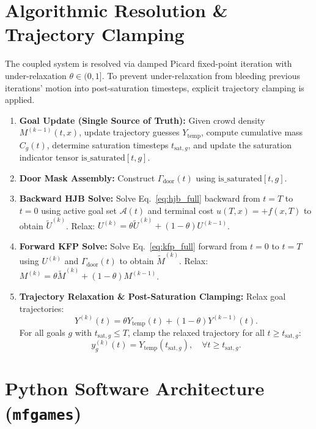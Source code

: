 \documentclass[11pt,a4paper]{article}
\begin{document}
\section{Algorithmic Resolution \& Trajectory Clamping}

The coupled system is resolved via damped Picard fixed-point iteration with under-relaxation $\theta \in (0, 1]$. To prevent under-relaxation from bleeding previous iterations' motion into post-saturation timesteps, explicit trajectory clamping is applied.

\begin{enumerate}
    \item \textbf{Goal Update (Single Source of Truth):} Given crowd density $M^{(k-1)}(t, x)$, update trajectory guesses $Y_{\text{temp}}$, compute cumulative mass $C_g(t)$, determine saturation timesteps $t_{\text{sat}, g}$, and update the saturation indicator tensor $\text{is\_saturated}[t, g]$.
    \item \textbf{Door Mask Assembly:} Construct $\Gamma_{\text{door}}(t)$ using $\text{is\_saturated}[t, g]$.
    \item \textbf{Backward HJB Solve:} Solve Eq.~\eqref{eq:hjb_full} backward from $t = T$ to $t = 0$ using active goal set $\mathcal{A}(t)$ and terminal cost $u(T, x) = +f(x, T)$ to obtain $\tilde{U}^{(k)}$. Relax: $U^{(k)} = \theta \tilde{U}^{(k)} + (1-\theta) U^{(k-1)}$.
    \item \textbf{Forward KFP Solve:} Solve Eq.~\eqref{eq:kfp_full} forward from $t = 0$ to $t = T$ using $U^{(k)}$ and $\Gamma_{\text{door}}(t)$ to obtain $\tilde{M}^{(k)}$. Relax: $M^{(k)} = \theta \tilde{M}^{(k)} + (1-\theta) M^{(k-1)}$.
    \item \textbf{Trajectory Relaxation \& Post-Saturation Clamping:} Relax goal trajectories:
    \begin{equation}
    Y^{(k)}(t) = \theta Y_{\text{temp}}(t) + (1-\theta) Y^{(k-1)}(t).
    \end{equation}
    For all goals $g$ with $t_{\text{sat}, g} \le T$, clamp the relaxed trajectory for all $t \ge t_{\text{sat}, g}$:
    \begin{equation}
    y_g^{(k)}(t) = Y_{\text{temp}}(t_{\text{sat}, g}), \quad \forall t \ge t_{\text{sat}, g}.
    \end{equation}
\end{enumerate}

\section{Python Software Architecture (\texttt{mfgames})}
\end{document}
